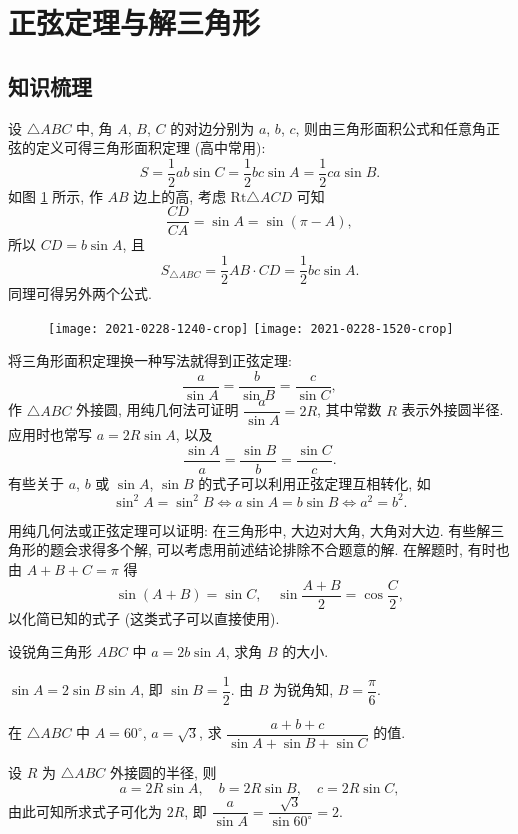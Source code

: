 
\section{正弦定理与解三角形}

\subsection{知识梳理}

设 $\triangle ABC$ 中, 角 $A$, $B$, $C$ 的对边分别为 $a$, $b$, $c$, 则由三角形面积公式和任意角正弦的定义可得三角形面积定理 (高中常用):
\[S= \frac{1}{2}ab\sin C=\frac{1}{2}bc\sin A=\frac{1}{2}ca\sin B.\]
如图 \ref{fig:2021-0228-1520} 所示, 作 $AB$ 边上的高, 考虑 $\mathrm{Rt}\triangle ACD$ 可知
\[\frac{CD}{CA}= \sin A= \sin(\pi-A),\]
所以 $CD= b\sin A$, 且
\[S_{\triangle ABC}= \frac12 AB\cdot CD
    = \frac12 bc\sin A.\]
同理可得另外两个公式.

\begin{figure}[hb]
    \small\centering
    \texttt{[image: 2021-0228-1240-crop]}\qquad
    \texttt{[image: 2021-0228-1520-crop]}
    \caption{}\label{fig:2021-0228-1520}
\end{figure}

将三角形面积定理换一种写法就得到正弦定理: 
\[\frac{a}{\sin A}= \frac{b}{\sin B}= \frac{c}{\sin C},\]
作 $\triangle ABC$ 外接圆, 用纯几何法可证明 $\dfrac{a}{\sin A}= 2R$, 其中常数 $R$ 表示外接圆半径. 应用时也常写 $a= 2R\sin A$, 以及
\[\frac{\sin A}a= \frac{\sin B}b= \frac{\sin C}c.\]
有些关于 $a$, $b$ 或 $\sin A$, $\sin B$ 的式子可以利用正弦定理互相转化, 如
\[\sin^2 A= \sin^2 B\Leftrightarrow a\sin A= b\sin B
    \Leftrightarrow a^2=b^2.\]

用纯几何法或正弦定理可以证明: 在三角形中, 大边对大角, 大角对大边. 有些解三角形的题会求得多个解, 可以考虑用前述结论排除不合题意的解. 在解题时, 有时也由 $A+ B+ C= \pi$ 得
\[\sin(A+ B)= \sin C,\quad \sin\frac{A+B}{2}= \cos\frac{C}{2},\]
以化简已知的式子 (这类式子可以直接使用).

\lianxi
\begin{exercise}
    设锐角三角形 $ABC$ 中 $a=2b\sin A$, 求角 $B$ 的大小.
\end{exercise}
\beginsolution
    $\sin A= 2\sin B\sin A$, 即 $\sin B= \dfrac12$. 由 $B$ 为锐角知, $B=\dfrac\pi6$.
\endsolution

\begin{exercise}
    在 $\triangle ABC$ 中 $A=60^\circ$, $a=\sqrt3$, 求 $\dfrac{a+b+c}{\sin A+ \sin B+ \sin C}$ 的值.
\end{exercise}
\beginsolution
    设 $R$ 为 $\triangle ABC$ 外接圆的半径, 则
    \[a= 2R\sin A,\quad b=2R\sin B,\quad c=2R\sin C,\]
    由此可知所求式子可化为 $2R$, 即 $\dfrac{a}{\sin A}= \dfrac{\sqrt3}{\sin 60^\circ}= 2$.
\endsolution

